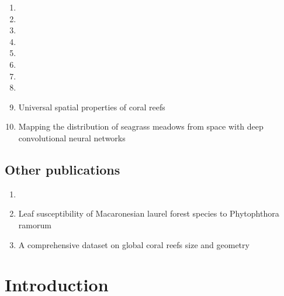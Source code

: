 \documentclass[
	10pt, %
	fleqn, %
	a4paper, %
]{LegrandOrangeBook}
\begin{document}
\begin{enumerate}
	\item {}
	      \vspace{0.5 cm}
	\item {}
	      \vspace{0.5 cm}
	\item {}
	      \vspace{0.5 cm}
	\item {}
	      \vspace{0.5 cm}
	\item {}
	      \vspace{0.5 cm}
	\item {}
	      \vspace{0.5 cm}
	\item {}
	      \vspace{0.5 cm}
	\item {}
	      \vspace{0.5 cm}
	\item Universal spatial properties of coral reefs
	      \vspace{0.5cm}
	\item Mapping the distribution of seagrass meadows from space with deep
	      convolutional neural networks
\end{enumerate}

\chapter*{Other publications}

\begin{enumerate}
	\item {}
	      \vspace{0.5 cm}
	\item Leaf susceptibility of Macaronesian laurel forest species to
	      Phytophthora ramorum
	      \vspace{0.5 cm}
	\item A comprehensive dataset on global coral reefs size and
	      geometry
	      \vspace{0.5 cm}

\end{enumerate}

{
\hypersetup{hidelinks}
\part{Introduction}
}
\end{document}
